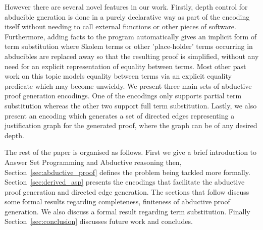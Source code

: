 However there are several novel features in our work.  Firstly, depth  control for abducible gneration is done in a purely declarative way as part of the encoding itself without needing to call external functions or other pieces of software. Furthermore, adding facts to the program automatically gives an implicit form of term substitution where Skolem terms or
other 'place-holder' terms occurring in abducibles are replaced away so that
the resulting proof is simplified, without any need for an explicit representation of equality between terms. Most other past work on this topic models equality between terms via an explicit equality predicate which may become unwieldy. We present three main sets of abductive proof generation encodings. One of the encodings only supports partial term substitution whereas the other two support full term substitution. Lastly, we also present an encoding which generates a set of directed edges representing a justification 
graph  for the generated proof, where the graph can be of any desired depth.

The rest of the paper is organised as
follows. First we give a brief introduction to Answer Set Programming and Abductive reasoning then, Section~\ref{sec:abductive_proof} defines the problem being tackled more formally. Section~\ref{sec:derived_asp} presents the encodings that facilitate the abductive proof generation and directed edge generation. The sections that follow discuss some formal results regarding completeness, finiteness of abductive proof generation. We also discuss a formal result regarding term substitution. Finally Section~\ref{sec:conclusion} discusses
future work and concludes.

